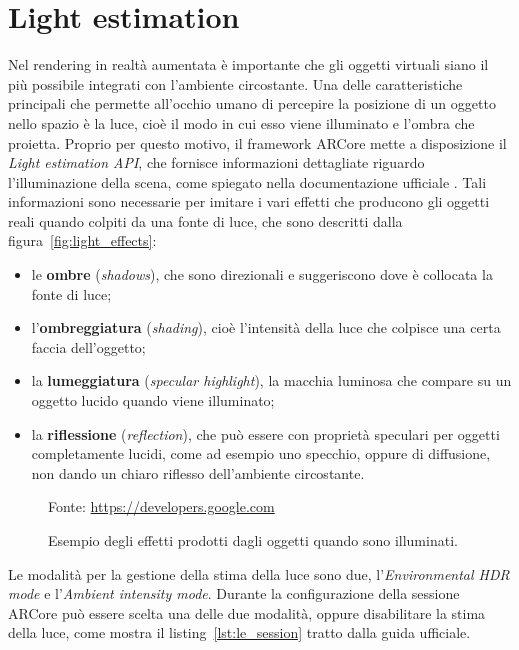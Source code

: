 \documentclass[crop=false, class=book]{standalone}
\begin{document}
	\section{Light estimation}
	Nel rendering in realtà aumentata è importante che gli oggetti virtuali siano il più possibile integrati con l'ambiente circostante. Una delle caratteristiche principali che permette all'occhio umano di percepire la posizione di un oggetto nello spazio è la luce, cioè il modo in cui esso viene illuminato e l'ombra che proietta. 
	Proprio per questo motivo, il framework ARCore mette a disposizione il \textit{Light estimation API}, che fornisce informazioni dettagliate riguardo l'illuminazione della scena, come spiegato nella documentazione ufficiale \cite{google2022light}.
	Tali informazioni sono necessarie per imitare i vari effetti che producono gli oggetti reali quando colpiti da una fonte di luce, che sono descritti dalla figura~\vref{fig:light_effects}:
	\begin{itemize}
		\item le \textbf{ombre} (\textit{shadows}), che sono direzionali e suggeriscono dove è collocata la fonte di luce;
		\item l'\textbf{ombreggiatura} (\textit{shading}), cioè l'intensità della luce che colpisce una certa faccia dell'oggetto;
		\item la \textbf{lumeggiatura} (\textit{specular highlight}), la macchia luminosa che compare su un oggetto lucido quando viene illuminato;
		\item la \textbf{riflessione} (\textit{reflection}), che può essere con proprietà speculari per oggetti completamente lucidi, come ad esempio uno specchio, oppure di diffusione, non dando un chiaro riflesso dell'ambiente circostante. 
	\end{itemize}
	
	\begin{figure}
		\centering
			{Fonte: \url{https://developers.google.com}}
		\caption{Esempio degli effetti prodotti dagli oggetti quando sono illuminati.}
		\label{fig:light_effects}
	\end{figure}
    \noindent
	Le modalità per la gestione della stima della luce sono due, l'\textit{Environmental HDR mode} e l'\textit{Ambient intensity mode}. Durante la configurazione della sessione ARCore può essere scelta una delle due modalità, oppure disabilitare la stima della luce, come mostra il listing~\vref{lst:le_session} tratto dalla guida ufficiale.
	\\
	
\end{document}
